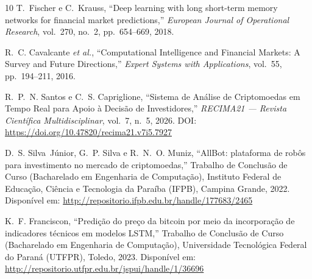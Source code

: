 \documentclass[conference]{IEEEtran}
\begin{document}
\begin{thebibliography}{10}
T.~Fischer e C.~Krauss,
``Deep learning with long short-term memory networks for financial market predictions,''
\textit{European Journal of Operational Research}, vol.~270, no.~2, pp.~654--669, 2018.

R.~C. Cavalcante \textit{et al.},
``Computational Intelligence and Financial Markets: A Survey and Future Directions,''
\textit{Expert Systems with Applications}, vol.~55, pp.~194--211, 2016.

R.~P.~N. Santos e C.~S. Capriglione,
``Sistema de An\'alise de Criptomoedas em Tempo Real para Apoio \`a Decis\~ao de Investidores,''
\textit{RECIMA21 --- Revista Cient\'ifica Multidisciplinar}, vol.~7, n.~5, 2026.
DOI: \url{https://doi.org/10.47820/recima21.v7i5.7927}

D.~S. Silva~J\'{u}nior, G.~P. Silva e R.~N.~O. Muniz,
``AllBot: plataforma de rob\^{o}s para investimento no mercado de criptomoedas,''
Trabalho de Conclus\~ao de Curso (Bacharelado em Engenharia de Computa\c{c}\~ao),
Instituto Federal de Educa\c{c}\~ao, Ci\^encia e Tecnologia da Para\'{i}ba (IFPB),
Campina Grande, 2022.
Dispon\'{i}vel em: \url{http://repositorio.ifpb.edu.br/handle/177683/2465}

K.~F. Franciscon,
``Predi\c{c}\~ao do pre\c{c}o da bitcoin por meio da incorpora\c{c}\~ao de indicadores t\'{e}cnicos em modelos LSTM,''
Trabalho de Conclus\~ao de Curso (Bacharelado em Engenharia de Computa\c{c}\~ao),
Universidade Tecnol\'{o}gica Federal do Paran\'{a} (UTFPR), Toledo, 2023.
Dispon\'{i}vel em: \url{http://repositorio.utfpr.edu.br/jspui/handle/1/36696}

\end{thebibliography}
\end{document}
